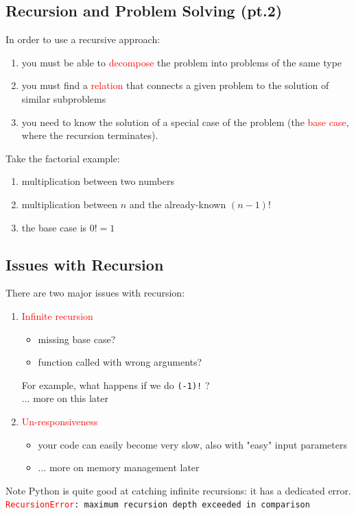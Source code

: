 \documentclass[t,handout,9pt]{beamer}
\begin{document}
\subsection{Recursion and Problem Solving (pt.2)}
\begin{frame}
\vfill
In order to use a recursive approach:
\begin{enumerate}
	\item you must be able to \textcolor{red}{decompose} the problem into problems of the same type
	\item you must find a \textcolor{red}{relation} that connects a given problem to the solution of similar subproblems
	\item you need to know the solution of a special case of the problem (the \textcolor{red}{base case}, where the recursion terminates).
\end{enumerate}
\vfill
Take the factorial example:
\begin{enumerate}
	\item multiplication between two numbers
	\item multiplication between $n$ and the already-known $(n-1)!$
	\item the base case is $0!=1$
\end{enumerate}
\vfill
\end{frame}
%
\subsection{Issues with Recursion}
\begin{frame}
\vfill
There are two major issues with recursion:
\begin{enumerate}
	\item \textcolor{red}{Infinite recursion}
	\begin{itemize}
		\item missing base case?
		\item function called with wrong arguments?
	\end{itemize}
	For example, what happens if we do \texttt{(-1)!} ?\\
	... more on this later
	\item \textcolor{red}{Un-responsiveness}
	\begin{itemize}
		\item your code can easily become very slow, also with "easy" input parameters
		\item ... more on memory management later
	\end{itemize}
\end{enumerate}
\vfill
\begin{block}{Note}
Python is quite good at catching infinite recursions: it has a dedicated error.\\
\texttt{\textcolor{red}{RecursionError}: maximum recursion depth exceeded in comparison}
\end{block}
\vfill
\end{frame}
\end{document}
